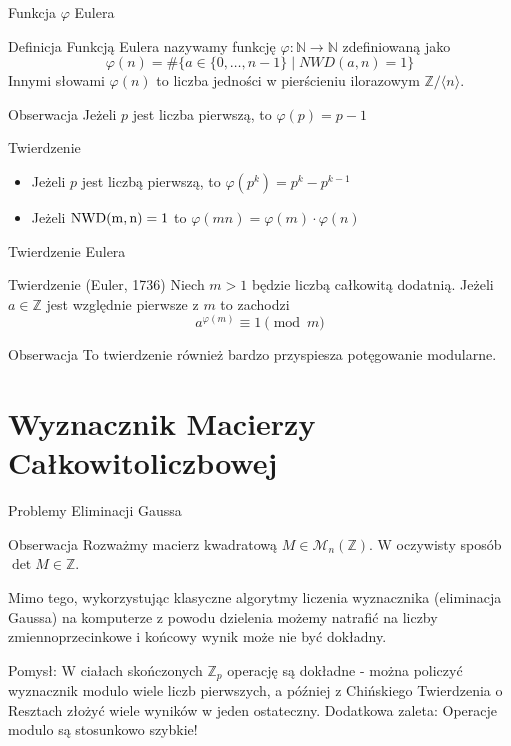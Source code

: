 \documentclass{beamer}
\newcommand{\NWD}{\rm{NWD}}
\let\phi\varphi
\begin{document}
\begin{frame}{Funkcja $\phi$ Eulera}
    \begin{block}{Definicja}
        Funkcją Eulera nazywamy funkcję $\phi : \mathbb{N} \rightarrow \mathbb{N}$ zdefiniowaną jako
        $$\phi(n) = \# \{a \in \{0,\ldots, n-1\} \mid NWD(a,n) = 1\}$$
        Innymi słowami $\phi(n)$ to liczba jedności w pierścieniu ilorazowym $\mathbb{Z}/\langle n \rangle.$
    \end{block}
    \pause 
    \begin{alertblock}{Obserwacja}
        Jeżeli $p$ jest liczba pierwszą, to $\phi(p) = p-1$
    \end{alertblock}
    \begin{block}{Twierdzenie}
        \begin{itemize}
            \item Jeżeli $p$ jest liczbą pierwszą, to $\phi(p^k) = p^k - p^{k-1}$
            \item Jeżeli $\NWD(m,n) = 1$ to $\phi(mn) = \phi(m) \cdot \phi(n)$
        \end{itemize}
    \end{block}
\end{frame}

\begin{frame}{Twierdzenie Eulera}
    \begin{block}{Twierdzenie (Euler, 1736)}
        Niech $m >1$ będzie liczbą całkowitą dodatnią. Jeżeli $a \in \mathbb{Z}$ jest względnie pierwsze z $m$ to zachodzi 
        $$a^{\phi(m)} \equiv 1 \pmod{m}$$
    \end{block}
    \pause 
    \begin{alertblock}{Obserwacja}
        To twierdzenie również bardzo przyspiesza potęgowanie modularne.
    \end{alertblock}
\end{frame}

\section{Wyznacznik Macierzy Całkowitoliczbowej}
\begin{frame}{Problemy Eliminacji Gaussa}
    \begin{alertblock}{Obserwacja}
        Rozważmy macierz kwadratową $M \in \mathcal{M}_{n}(\mathbb{Z})$.
        W oczywisty sposób $\det M \in \mathbb{Z}$. 
        
        Mimo tego, wykorzystując klasyczne algorytmy liczenia wyznacznika (eliminacja Gaussa) na komputerze 
        z powodu dzielenia możemy natrafić na liczby zmiennoprzecinkowe i końcowy wynik może nie być dokładny. 

        Pomysł: W ciałach skończonych $\mathbb{Z}_p$ operację są dokładne - można policzyć wyznacznik modulo wiele liczb pierwszych, a później z Chińskiego Twierdzenia o Resztach złożyć wiele wyników w jeden ostateczny.
        Dodatkowa zaleta: Operacje modulo są stosunkowo szybkie!
    \end{alertblock}
\end{frame}
\end{document}
